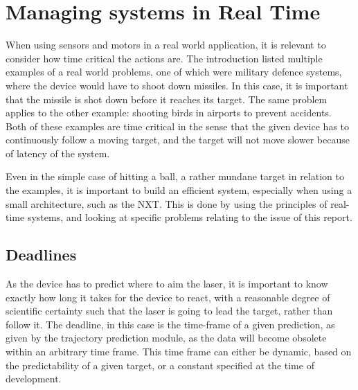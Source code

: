 
\section{Managing systems in Real Time}
\label{sec:rts-intro}
When using sensors and motors in a real world application, it is relevant to consider how time critical the actions are.
The introduction listed multiple examples of a real world problems, one of which were military defence systems, where the device would have to shoot down missiles.
In this case, it is important that the missile is shot down before it reaches its target.
The same problem applies to the other example: shooting birds in airports to prevent accidents.
Both of these examples are time critical in the sense that the given device has to continuously follow a moving target, and the target will not move slower because of latency of the system.

Even in the simple case of hitting a ball, a rather mundane target in relation to the examples, it is important to build an efficient system, especially when using a small architecture, such as the NXT.
This is done by using the principles of real-time systems, and looking at specific problems relating to the issue of this report.

\subsection{Deadlines}
As the device has to predict where to aim the laser, it is important to know exactly how long it takes for the device to react, with a reasonable degree of scientific certainty such that the laser is going to lead the target, rather than follow it. 
The deadline, in this case is the time-frame of a given prediction, as given by the trajectory prediction module, as the data will become obsolete within an arbitrary time frame.
This time frame can either be dynamic, based on the predictability of a given target, or a constant specified at the time of development.


